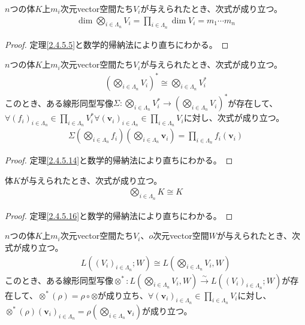\documentclass[dvipdfmx]{jsarticle}
\begin{document}
\begin{thm}\label{2.4.6.4}
$n$つの体$K$上$m_{i}$次元vector空間たち$V_{i}$が与えられたとき、次式が成り立つ。
\begin{align*}
\dim{\bigotimes_{i \in \varLambda_{n}} V_{i}} = \prod_{i \in \varLambda_{n}} {\dim V_{i}} = m_{1}\cdots m_{n}
\end{align*}
\end{thm}
\begin{proof} 定理\ref{2.4.5.5}と数学的帰納法により直ちにわかる。
\end{proof}
\begin{thm}\label{2.4.6.5}
$n$つの体$K$上$m_{i}$次元vector空間たち$V_{i}$が与えられたとき、次式が成り立つ。
\begin{align*}
\left( \bigotimes_{i \in \varLambda_{n}} V_{i} \right)^{*} \cong \bigotimes_{i \in \varLambda_{n}} V_{i}^{*}
\end{align*}
このとき、ある線形同型写像$\varSigma:\bigotimes_{i \in \varLambda_{n}} V_{i}^{*} \rightarrow \left( \bigotimes_{i \in \varLambda_{n}} V_{i} \right)^{*}$が存在して、$\forall\left( f_{i} \right)_{i \in \varLambda_{n}} \in \prod_{i \in \varLambda_{n}} V_{i}^{*}\forall\left( \mathbf{v}_{i} \right)_{i \in \varLambda_{n}} \in \prod_{i \in \varLambda_{n}} V_{i}$に対し、次式が成り立つ。
\begin{align*}
\varSigma\left( \bigotimes_{i \in \varLambda_{n}} f_{i} \right)\left( \bigotimes_{i \in \varLambda_{n}} \mathbf{v}_{i} \right) = \prod_{i \in \varLambda_{n}} {f_{i}\left( \mathbf{v}_{i} \right)}
\end{align*}
\end{thm}
\begin{proof} 定理\ref{2.4.5.14}と数学的帰納法により直ちにわかる。
\end{proof}
\begin{thm}\label{2.4.6.6}
体$K$が与えられたとき、次式が成り立つ。
\begin{align*}
\bigotimes_{i \in \varLambda_{n}} K \cong K
\end{align*}
\end{thm}
\begin{proof} 定理\ref{2.4.5.16}と数学的帰納法により直ちにわかる。
\end{proof}
\begin{thm}\label{2.4.6.7}
$n$つの体$K$上$m_{i}$次元vector空間たち$V_{i}$、$o$次元vector空間$W$が与えられたとき、次式が成り立つ。
\begin{align*}
L\left( \left( V_{i} \right)_{i \in \varLambda_{n}};W \right) \cong L\left( \bigotimes_{i \in \varLambda_{n}} V_{i},W \right)
\end{align*}
このとき、ある線形同型写像$\otimes^{*}:L\left( \bigotimes_{i \in \varLambda_{n}} V_{i},W \right)\overset{\sim}{\rightarrow}L\left( \left( V_{i} \right)_{i \in \varLambda_{n}};W \right)$が存在して、$\otimes^{*}(\rho) = \rho \circ \otimes$が成り立ち、$\forall\left( \mathbf{v}_{i} \right)_{i \in \varLambda_{n}} \in \prod_{i \in \varLambda_{n}} V_{i}$に対し、$\otimes^{*}(\rho)\left( \mathbf{v}_{i} \right)_{i \in \varLambda_{n}} = \rho\left( \bigotimes_{i \in \varLambda_{n}} \mathbf{v}_{i} \right)$が成り立つ。
\end{thm}
\end{document}
